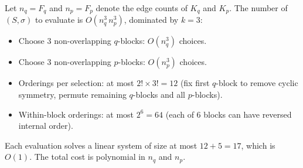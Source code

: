 \begin{remark}[Complexity]\label{rem:billiard-complexity}
Let $n_q = F_q$ and $n_p = F_p$ denote the edge counts of $K_q$
and $K_p$.
The number of $(S, \sigma)$ to evaluate is
$O(n_q^3 \, n_p^3)$, dominated by $k = 3$:
\begin{itemize}
\item Choose $3$ non-overlapping $q$-blocks: $O(n_q^3)$ choices.
\item Choose $3$ non-overlapping $p$-blocks: $O(n_p^3)$ choices.
\item Orderings per selection: at most $2! \times 3! = 12$
  (fix first $q$-block to remove cyclic symmetry,
  permute remaining $q$-blocks and all $p$-blocks).
\item Within-block orderings: at most $2^6 = 64$
  (each of 6 blocks can have reversed internal order).
\end{itemize}
Each evaluation solves a linear system of size at most
$12 + 5 = 17$, which is $O(1)$.
The total cost is polynomial in $n_q$ and $n_p$.
\end{remark}
